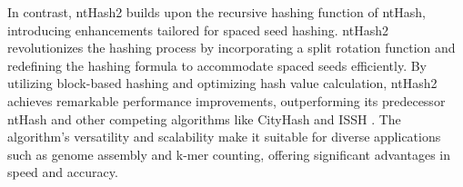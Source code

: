 In contrast, ntHash2 builds upon the recursive hashing function of ntHash, introducing enhancements tailored for spaced seed hashing. ntHash2 revolutionizes the hashing process by incorporating a split rotation function and redefining the hashing formula to accommodate spaced seeds efficiently. By utilizing block-based hashing and optimizing hash value calculation, ntHash2 achieves remarkable performance improvements, outperforming its predecessor ntHash and other competing algorithms like CityHash and \acs{ISSH} \cite{mohamadi2016ntHash}. The algorithm's versatility and scalability make it suitable for diverse applications such as genome assembly and k-mer counting, offering significant advantages in speed and accuracy.



